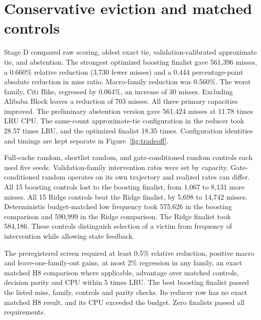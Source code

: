 \documentclass[11pt,letterpaper]{article}
\begin{document}
\section{Conservative eviction and matched controls}
Stage D compared raw scoring, oldest exact tie, validation-calibrated approximate tie, and abstention. The strongest optimized boosting finalist gave 561,396 misses, a 0.660\% relative reduction (3,730 fewer misses) and a 0.444 percentage-point absolute reduction in miss ratio. Macro-family reduction was 0.560\%. The worst family, Citi Bike, regressed by 0.064\%, an increase of 30 misses. Excluding Alibaba Block leaves a reduction of 703 misses. All three primary capacities improved. The preliminary abstention version gave 561,424 misses at 11.78 times LRU CPU. The same-count approximate-tie configuration in the reducer took 28.57 times LRU, and the optimized finalist 18.35 times. Configuration identities and timings are kept separate in Figure~\ref{fig:tradeoff}.

Full-cache random, shortlist random, and gate-conditioned random controls each used five seeds. Validation-family intervention rates were set by capacity. Gate-conditioned random operates on its own trajectory and realized rates can differ. All 15 boosting controls lost to the boosting finalist, from 1,067 to 8,131 more misses. All 15 Ridge controls beat the Ridge finalist, by 5,698 to 14,742 misses. Deterministic budget-matched low frequency took 575,626 in the boosting comparison and 590,999 in the Ridge comparison. The Ridge finalist took 584,186. These controls distinguish selection of a victim from frequency of intervention while allowing state feedback.

The preregistered screen required at least 0.5\% relative reduction, positive macro and leave-one-family-out gains, at most 2\% regression in any family, an exact matched H8 comparison where applicable, advantage over matched controls, decision parity and CPU within 5 times LRU. The best boosting finalist passed the listed miss, family, controls and parity checks. Its reducer row has no exact matched H8 result, and its CPU exceeded the budget. Zero finalists passed all requirements.
\end{document}
